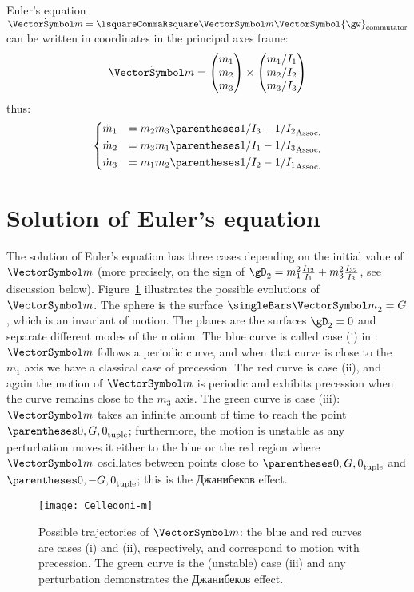 \documentclass[10pt, a4paper, twoside]{basestyle}
\begin{document}
Euler's equation $\TimeDerivative{\vm} = \commutator{\vm}{\VectorSymbol{\gw}}$ can be written in coordinates in the principal axes frame:
\[
\TimeDerivative{\vm} =
\begin{pmatrix}
m_1 \\ m_2 \\ m_3
\end{pmatrix}
\times
\begin{pmatrix}
m_1/I_1 \\ m_2/I_2 \\ m_3/I_3
\end{pmatrix}
\]
thus:
\begin{equation}
\begin{dcases}
\TimeDerivative{m}_1 &= m_2 m_3 \pa{1/I_3 - 1/I_2}\\
\TimeDerivative{m}_2 &= m_3 m_1 \pa{1/I_1 - 1/I_3}\\
\TimeDerivative{m}_3 &= m_1 m_2 \pa{1/I_2 - 1/I_1}
\end{dcases}
\label{eqneuler}
\end{equation}
\section*{Solution of Euler's equation}
The solution of Euler's equation has three cases depending on the initial value of $\vm$ (more precisely, on the sign of
$\gD_2 = m_1^2 \frac{I_{12}}{I_1} + m_3^2 \frac{I_{32}}{I_3}$, see discussion below).  Figure~\ref{figm} illustrates the 
possible evolutions of $\vm$. The sphere is the surface $\norm\vm = G$, which is an invariant of motion.  The planes are
the surfaces $\gD_2 = 0$ and separate different modes of the motion.
The blue curve is called case (i) in \cite{Celledoni2007}: $\vm$ follows a periodic curve, and when that curve is close to the $m_1$
axis we have a classical case of precession.  The red curve is case (ii), and again the motion of $\vm$ is periodic and exhibits 
precession when the curve remains close to the $m_3$ axis.  The green curve is case (iii): $\vm$ takes an infinite amount
of time to reach the point $\tuple{0, G, 0}$; furthermore, the motion is unstable as any perturbation moves it either to
the blue or the red region where $\vm$ oscillates between points close to $\tuple{0, G, 0}$ and $\tuple{0, -G, 0}$; this is 
the Джанибеков effect.
\begin{figure}[htb!]
\centering
\texttt{[image: Celledoni-m]}
\caption{Possible trajectories of $\vm$: the blue and red curves are cases (i) and (ii), respectively, and correspond to motion
with precession.  The green curve is the (unstable) case (iii) and any perturbation demonstrates the Джанибеков effect.\label{figm}}
\end{figure}
\end{document}
